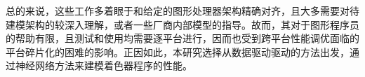 



总的来说，这些工作多着眼于和给定的图形处理器架构精确对齐，且大多需要对待建模架构的较深入理解，或者一些厂商内部模型的指导。故而，其对于图形程序员的帮助有限，且测试和使用均需要逐平台进行，因而也受到跨平台性能调优面临的平台碎片化的困难的影响。正因如此，本研究选择从数据驱动驱动的方法出发，通过神经网络方法来建模着色器程序的性能。
